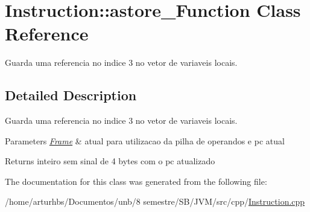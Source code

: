 \hypertarget{classInstruction_1_1astore__3Function}{}\section{Instruction\+:\+:astore\+\_\+Function Class Reference}
\label{classInstruction_1_1astore__3Function}


Guarda uma referencia no indice 3 no vetor de variaveis locais.  




\subsection{Detailed Description}
Guarda uma referencia no indice 3 no vetor de variaveis locais. 


\begin{DoxyParams}{Parameters}
{\em \hyperlink{classFrame}{Frame}} & atual para utilizacao da pilha de operandos e pc atual \\
\hline
\end{DoxyParams}
\begin{DoxyReturn}{Returns}
inteiro sem sinal de 4 bytes com o pc atualizado 
\end{DoxyReturn}


The documentation for this class was generated from the following file\+:\begin{DoxyCompactItemize}
\item 
/home/arturhbs/\+Documentos/unb/8 semestre/\+S\+B/\+J\+V\+M/src/cpp/\hyperlink{Instruction_8cpp}{Instruction.\+cpp}\end{DoxyCompactItemize}
